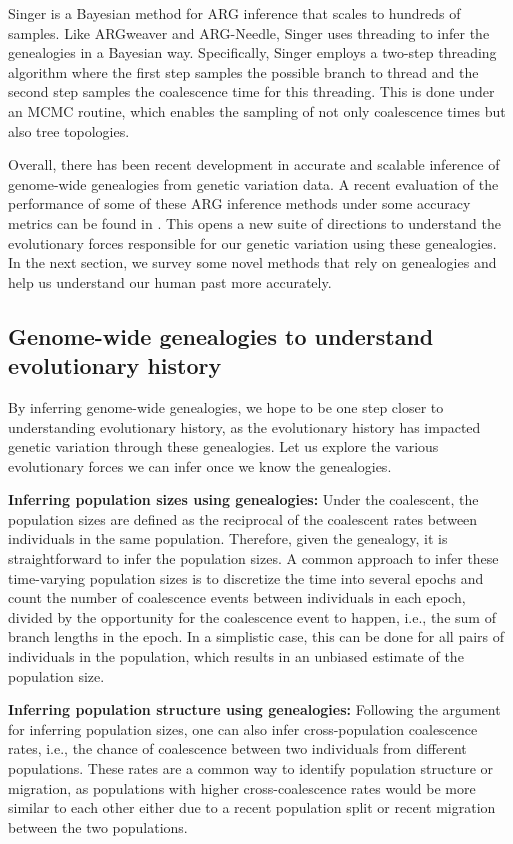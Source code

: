 Singer \cite{deng2024robust} is a Bayesian method for ARG inference that scales to hundreds of samples. Like ARGweaver and ARG-Needle, Singer uses threading to infer the genealogies in a Bayesian way. Specifically, Singer employs a two-step threading algorithm where the first step samples the possible branch to thread and the second step samples the coalescence time for this threading. This is done under an MCMC routine, which enables the sampling of not only coalescence times but also tree topologies.

Overall, there has been recent development in accurate and scalable inference of genome-wide genealogies from genetic variation data. A recent evaluation of the performance of some of these ARG inference methods under some accuracy metrics can be found in \cite{brandt2022evaluation}. This opens a new suite of directions to understand the evolutionary forces responsible for our genetic variation using these genealogies. In the next section, we survey some novel methods that rely on genealogies and help us understand our human past more accurately.

\subsection{Genome-wide genealogies to understand evolutionary history}

By inferring genome-wide genealogies, we hope to be one step closer to understanding evolutionary history, as the evolutionary history has impacted genetic variation through these genealogies. Let us explore the various evolutionary forces we can infer once we know the genealogies.

\textbf{Inferring population sizes using genealogies:} Under the coalescent, the population sizes are defined as the reciprocal of the coalescent rates between individuals in the same population. Therefore, given the genealogy, it is straightforward to infer the population sizes. A common approach to infer these time-varying population sizes is to discretize the time into several epochs and count the number of coalescence events between individuals in each epoch, divided by the opportunity for the coalescence event to happen, i.e., the sum of branch lengths in the epoch. In a simplistic case, this can be done for all pairs of individuals in the population, which results in an unbiased estimate of the population size.

\textbf{Inferring population structure using genealogies:} Following the argument for inferring population sizes, one can also infer cross-population coalescence rates, i.e., the chance of coalescence between two individuals from different populations. These rates are a common way to identify population structure or migration, as populations with higher cross-coalescence rates would be more similar to each other either due to a recent population split or recent migration between the two populations.

